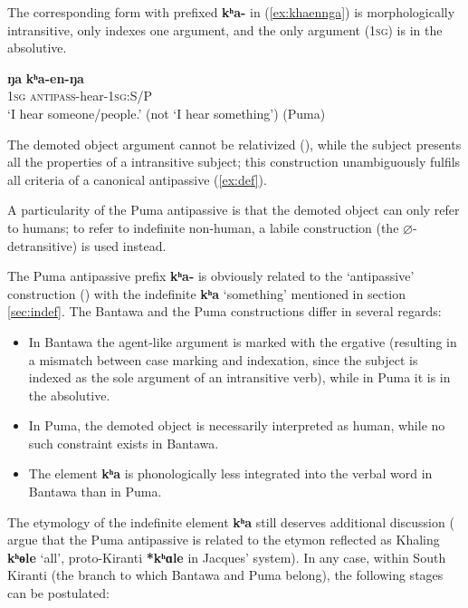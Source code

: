 \documentclass[oneside,a4paper,11pt]{article}
\newcommand{\ipa}[1]{{\phon\textbf{#1}}}
\begin{document}
The corresponding form with prefixed \ipa{kʰa-} in (\ref{ex:khaennga}) is morphologically intransitive, only indexes one argument, and the only argument (\textsc{1sg}) is in the absolutive. 

\begin{exe}
\ex \label{ex:khaennga}
\gll 
\ipa{ŋa} \ipa{kʰa-en-ŋa} \\
\textsc{1sg} \textsc{antipass}-hear-\textsc{1sg}:S/P \\
\glt `I hear someone/people.' (not `I hear something') (Puma)
\end{exe}
 
The demoted object argument cannot be relativized (\citealt[10]{bickel07puma}), while the subject presents all the properties of a intransitive subject; this construction unambiguously fulfils all criteria of a canonical antipassive (\ref{ex:def}). 

A particularity of the Puma antipassive is that the demoted object can only refer to humans; to refer to indefinite non-human, a labile construction (the $\varnothing$-detransitive) is used instead.

The Puma antipassive prefix \ipa{kʰa-} is obviously related to the `antipassive' construction (\citealt[226;335]{doornenbal09}) with the indefinite \ipa{kʰa} `something' mentioned in section \ref{sec:indef}. The Bantawa and the Puma constructions differ in several regards:
\begin{itemize}
\item In Bantawa the agent-like argument is marked with the ergative (resulting in a mismatch between case marking and indexation, since the subject is indexed as the sole argument of an intransitive verb), while in Puma it is in the absolutive.
\item In Puma, the demoted object is necessarily interpreted as human, while no such constraint exists in Bantawa.
\item The element \ipa{kʰa} is phonologically less integrated into the verbal word in Bantawa than in Puma.
\end{itemize}

The etymology of the indefinite element \ipa{kʰa} still deserves additional discussion (\citealt[67]{bickel15antipassive} argue that the Puma antipassive is related to the etymon reflected as Khaling \ipa{kʰɵle} `all', proto-Kiranti \ipa{*kʰɑle} in Jacques' \citeyear{jacques17pkiranti} system). In any case, within South Kiranti (the branch to which Bantawa and Puma belong), the following stages can be postulated:
\end{document}
